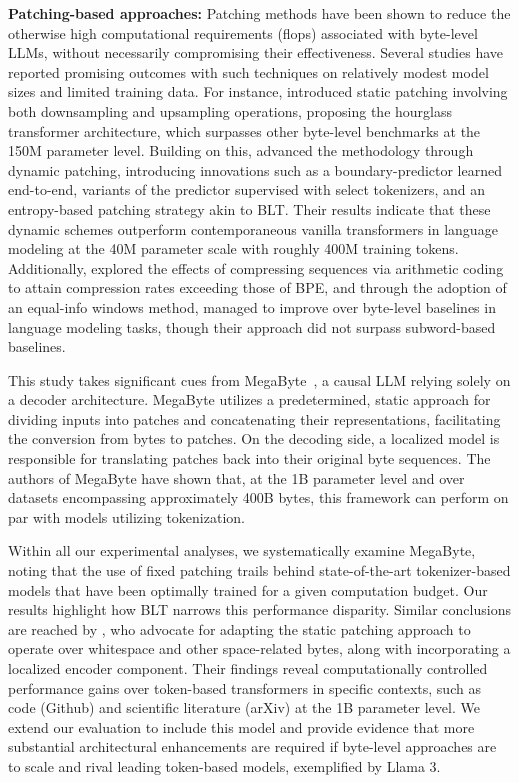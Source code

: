 \textbf{Patching-based approaches:} Patching methods have been shown to reduce the otherwise high computational requirements (flops) associated with byte-level LLMs, without necessarily compromising their effectiveness. Several studies have reported promising outcomes with such techniques on relatively modest model sizes and limited training data. For instance, \cite{nawrot-etal-2022-hierarchical} introduced static patching involving both downsampling and upsampling operations, proposing the hourglass transformer architecture, which surpasses other byte-level benchmarks at the 150M parameter level. Building on this, \cite{nawrot-etal-2023-efficient} advanced the methodology through dynamic patching, introducing innovations such as a boundary-predictor learned end-to-end, variants of the predictor supervised with select tokenizers, and an entropy-based patching strategy akin to {\textsc BLT}. Their results indicate that these dynamic schemes outperform contemporaneous vanilla transformers in language modeling at the 40M parameter scale with roughly 400M training tokens. Additionally, \cite{lester2024training} explored the effects of compressing sequences via arithmetic coding to attain compression rates exceeding those of BPE, and through the adoption of an equal-info windows method, managed to improve over byte-level baselines in language modeling tasks, though their approach did not surpass subword-based baselines.

This study takes significant cues from MegaByte~\citep{yu2023megabyte}, a causal LLM relying solely on a decoder architecture. MegaByte utilizes a predetermined, static approach for dividing inputs into patches and concatenating their representations, facilitating the conversion from bytes to patches. On the decoding side, a localized model is responsible for translating patches back into their original byte sequences. The authors of MegaByte have shown that, at the 1B parameter level and over datasets encompassing approximately 400B bytes, this framework can perform on par with models utilizing tokenization.

Within all our experimental analyses, we systematically examine MegaByte, noting that the use of fixed patching trails behind state-of-the-art tokenizer-based models that have been optimally trained for a given computation budget. Our results highlight how {\textsc BLT} narrows this performance disparity. Similar conclusions are reached by \cite{slagle2024spacebyte}, who advocate for adapting the static patching approach to operate over whitespace and other space-related bytes, along with incorporating a localized encoder component. Their findings reveal computationally controlled performance gains over token-based transformers in specific contexts, such as code (Github) and scientific literature (arXiv) at the 1B parameter level. We extend our evaluation to include this model and provide evidence that more substantial architectural enhancements are required if byte-level approaches are to scale and rival leading token-based models, exemplified by Llama 3.

